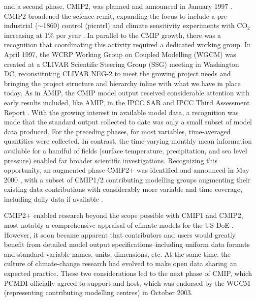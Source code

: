 \documentclass[gmd, preprint]{copernicus}
\begin{document}
and a second phase, CMIP2, was planned and announced in January 1997 \citep{meehl_intercomparison_1997, meehl_coupled_2000}. CMIP2 broadened the science remit, expanding the focus to include a pre-industrial ($\sim$1860) control (picntrl) and climate sensitivity experiments with CO$_{2}$ increasing at 1\% per year \citep[1pctto2x, 1pctto4x;][]{villwock_6th_2003, meehl_cmip_2003}. In parallel to the CMIP growth, there was a recognition that coordinating this activity required a dedicated working group. In April 1997, the WCRP Working Group on Coupled Modelling (WGCM) was created at a CLIVAR Scientific Steering Group (SSG) meeting in Washington DC, reconstituting CLIVAR NEG-2 to meet the growing project needs \citep{detemmerman_clivar_1997} and bringing the project structure and hierarchy inline with what we have in place today. As in AMIP, the CMIP model output received considerable attention with early results included, like AMIP, in the IPCC SAR \citep{gates_climate_1996} and IPCC Third Assessment Report \citep[TAR;][]{mcavaney_model_2001}. With the growing interest in available model data, a recognition was made that the standard output collected to date was only a small subset of model data produced. For the preceding phases, for most variables, time-averaged quantities were collected. In contrast, the time-varying monthly mean information available for a handful of fields (surface temperature, precipitation, and sea level pressure) enabled far broader scientific investigations. Recognizing this opportunity, an augmented phase CMIP2+ was identified and announced in May 2000 \citep{villwock_6th_2003, meehl_cmip_2003, meehl_overview_2005}, with a subset of CMIP1/2 contributing modelling groups augmenting their existing data contributions with considerably more variable and time coverage, including daily data if available \citep{achutarao_pcmdi_2004}.

CMIP2+ enabled research beyond the scope possible with CMIP1 and CMIP2, most notably a comprehensive appraisal of climate models for the US DoE \citep{achutarao_pcmdi_2004}. However, it soon became apparent that contributors and users would greatly benefit from detailed model output specifications--including uniform data formats and standard variable names, units, dimensions, etc. At the same time, the culture of climate-change research had evolved to make open data sharing an expected practice. These two considerations led to the next phase of CMIP, which PCMDI officially agreed to support and host, which was endorsed by the WGCM (representing contributing modelling centres) in October 2003.
\end{document}
